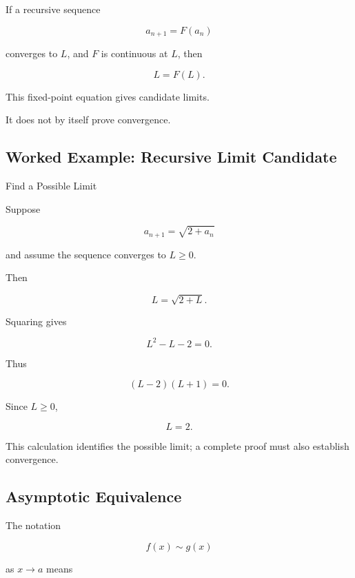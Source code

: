 If a recursive sequence

\[
a_{n+1}=F(a_n)
\]

converges to \(L\), and \(F\) is continuous at \(L\), then

\[
\boxed{
L=F(L).
}
\]

This fixed-point equation gives candidate limits.

It does not by itself prove convergence.

\subsection{Worked Example: Recursive Limit Candidate}
\label{subsec:worked-recursive-limit}

\begin{workedexamplebox}{Find a Possible Limit}

Suppose

\[
a_{n+1}
=
\sqrt{2+a_n}
\]

and assume the sequence converges to \(L\geq0\).

Then

\[
L
=
\sqrt{2+L}.
\]

Squaring gives

\[
L^2-L-2=0.
\]

Thus

\[
(L-2)(L+1)=0.
\]

Since \(L\geq0\),

\begin{answerbox}
\[
\boxed{
L=2.
}
\]
\end{answerbox}

This calculation identifies the possible limit; a complete proof must also
establish convergence.

\end{workedexamplebox}

\subsection{Asymptotic Equivalence}
\label{subsec:asymptotic-equivalence-limit}

The notation

\[
\boxed{
f(x)\sim g(x)
}
\]

as \(x\to a\) means

